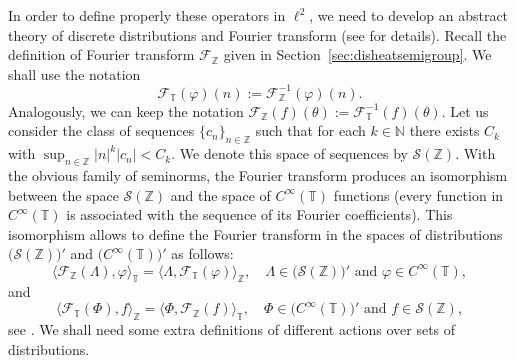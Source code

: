 \documentclass[11pt]{amsart}
\numberwithin{equation}{section}
\newcommand{\N}{\mathbb{N}}
\newcommand{\Z}{\mathbb{Z}}
\newcommand{\T}{\mathbb{T}}
\theoremstyle{plain}
\theoremstyle{remark}
\begin{document}
In order to define properly these operators in $\ell^2$, we need to develop an abstract theory of discrete distributions and Fourier transform (see \cite{Edwards, StWe} for details). Recall the definition of Fourier transform $\mathcal{F}_{\Z}$ given in Section~\ref{sec:disheatsemigroup}. We shall use the notation
\[
\mathcal{F}_\T(\varphi)(n):=\mathcal{F}^{-1}_\Z(\varphi)(n).
\]
Analogously, we can keep the notation $\mathcal{F}_\Z(f)(\theta):=\mathcal{F}^{-1}_\T(f)(\theta)$.
Let us consider the class of sequences  $\{c_n\}_{n \in \Z} $ such that for each $k\in \N$ there exists $C_k$ with $\sup_{n\in \Z}  |n|^k |c_n| < C_k.$ We denote this space of sequences by  $\mathcal{S}(\Z)$. With the obvious family of seminorms, the Fourier transform produces an isomorphism between the space  $\mathcal{S}(\Z)$ and  the  space of $C^\infty(\T)$ functions (every function in $C^\infty(\T)$ is associated with the sequence of its Fourier coefficients). This isomorphism  allows to define the Fourier transform in the spaces of distributions  $\big( \mathcal{S}(\Z) \big)'$ and $\big( C^\infty(\T) \big)'$  as follows:
\begin{equation}\label{FS}
\big\langle \mathcal{F}_\Z(\Lambda), \varphi \big\rangle_{\T} = \big\langle\Lambda,  \mathcal{F}_\T (\varphi) \big\rangle_{\Z},
\quad \Lambda \in \big( \mathcal{S}(\Z) \big)'  \text{ and }  \varphi  \in C^\infty(\T),
\end{equation}
and
\begin{equation}\label{FS2}
\big\langle \mathcal{F}_\T(\Phi), f \big\rangle_{\Z} = \big\langle\Phi,  \mathcal{F}_\Z (f) \big\rangle_{\T},
\quad \Phi \in \big(C^\infty(\T) \big)'  \text{ and }  f  \in \mathcal{S}(\Z),
\end{equation}
see \cite[Chapter~12]{Edwards}.  We shall need some extra definitions of different actions over sets of distributions.
\end{document}

